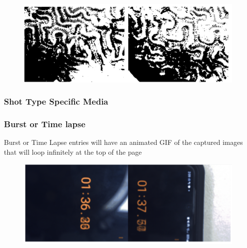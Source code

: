 \documentclass[12pt]{article}
\begin{document}
\begin{center}
\begin{figure}[H]
	\end{figure}
	\begin{figure}[H]
		\includegraphics[width=\textwidth]{Figures/Threshold-Imae.png}
	\end{figure}
	\subsubsection{Shot Type Specific Media}
	\subsubsection{Burst or Time lapse}
	Burst or Time Lapse entries will have an animated GIF of the captured images that will loop infinitely at the top of the page
	\begin{figure}[H]
		\includegraphics[width=\textwidth]{Figures/GIF.png}
	\end{figure}

\end{center}
\end{document}
